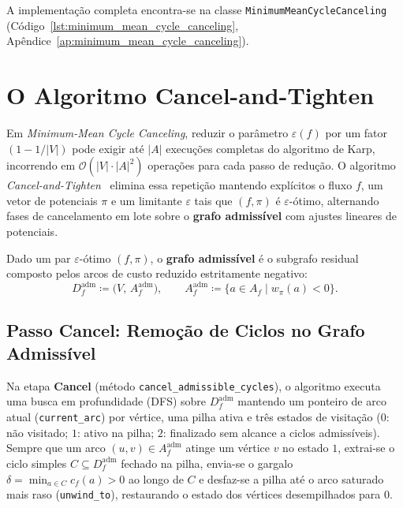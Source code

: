 A implementação completa encontra-se na classe \lstinline{MinimumMeanCycleCanceling} (Código~\ref{lst:minimum_mean_cycle_canceling}, Apêndice~\ref{ap:minimum_mean_cycle_canceling}).


\section{O Algoritmo Cancel-and-Tighten}\label{sec:cancel_and_tighten}

Em \textit{Minimum-Mean Cycle Canceling}, reduzir o parâmetro $\varepsilon(f)$ por um fator $(1 - 1/|V|)$ pode exigir até $|A|$ execuções completas do algoritmo de Karp, incorrendo em $\mathcal{O}(|V| \cdot |A|^2)$ operações para cada passo de redução. O algoritmo \textit{Cancel-and-Tighten}~\cite{goldberg1989finding} elimina essa repetição mantendo explícitos o fluxo $f$, um vetor de potenciais $\pi$ e um limitante $\varepsilon$ tais que $(f, \pi)$ é $\varepsilon$-ótimo, alternando fases de cancelamento em lote sobre o \textbf{grafo admissível} com ajustes lineares de potenciais.

\begin{definicao}
Dado um par $\varepsilon$-ótimo $(f, \pi)$, o \textbf{grafo admissível} é o subgrafo residual composto pelos arcos de custo reduzido estritamente negativo:
\begin{equation}
    D_f^{\text{adm}} \coloneqq \bigl(V,\, A_f^{\text{adm}}\bigr), \qquad
    A_f^{\text{adm}} \coloneqq \bigl\{ a \in A_f \mid w_\pi(a) < 0 \bigr\}.
\end{equation}
\end{definicao}


\subsection{Passo Cancel: Remoção de Ciclos no Grafo Admissível}

Na etapa \textbf{Cancel} (método \lstinline{cancel_admissible_cycles}), o algoritmo executa uma busca em profundidade (DFS) sobre $D_f^{\text{adm}}$ mantendo um ponteiro de arco atual (\lstinline{current_arc}) por vértice, uma pilha ativa e três estados de visitação ($0$: não visitado; $1$: ativo na pilha; $2$: finalizado sem alcance a ciclos admissíveis). Sempre que um arco $(u,v) \in A_f^{\text{adm}}$ atinge um vértice $v$ no estado $1$, extrai-se o ciclo simples $C \subseteq D_f^{\text{adm}}$ fechado na pilha, envia-se o gargalo $\delta = \min_{a \in C} c_f(a) > 0$ ao longo de $C$ e desfaz-se a pilha até o arco saturado mais raso (\lstinline{unwind_to}), restaurando o estado dos vértices desempilhados para $0$.

